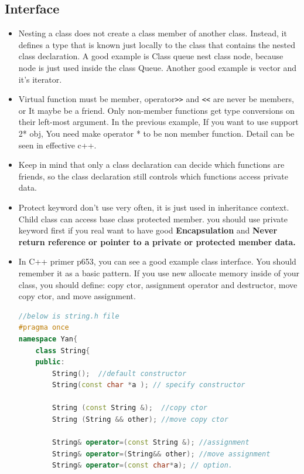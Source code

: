 \documentclass[a4paper,11pt,twoside]{book}
\begin{document}
\subsection{Interface}
\begin{itemize}
	
	\item Nesting a class does not create a class member of another class. Instead, it defines a type that is known just locally to the class that contains the nested class declaration.  A good example is Class queue nest class node,  because node is just used inside the class Queue. Another good example is vector and it's iterator.
	
	\item Virtual function must be member, operator\verb=>>= and \verb=<<= are never be members, or It maybe be a friend. Only non-member functions get type conversions on their left-most argument.  In the previous example, If you want to use support 2* obj, You need make operator * to be non member function.  Detail can be seen in effective c++.
	
	\item Keep in mind that only a class declaration can decide which functions are friends, so the class declaration still controls which functions access private data.
	
	\item Protect keyword don't use very often, it is just used in inheritance context. Child class can access base class protected member. you should use private keyword first if you real want to have good \textbf{Encapsulation} and \textbf{Never return reference or pointer to a private or protected member data.}
	
	\item In C++ primer p653, you can see a good example class interface. You should remember it as a basic pattern.  If you use new allocate memory inside of your class, you should define: copy ctor, assignment operator and destructor, move copy ctor, and move assignment.
	
\begin{lstlisting}[frame=single, language=c++]
//below is string.h file
#pragma once
namespace Yan{
	class String{
	public:
		String();  //default constructor
		String(const char *a ); // specify constructor
		
		String (const String &);  //copy ctor
		String (String && other); //move copy ctor
		
		String& operator=(const String &); //assignment
		String& operator=(String&& other); //move assignment
		String& operator=(const char*a); // option.
		

\end{lstlisting}
\end{itemize}
\end{document}
